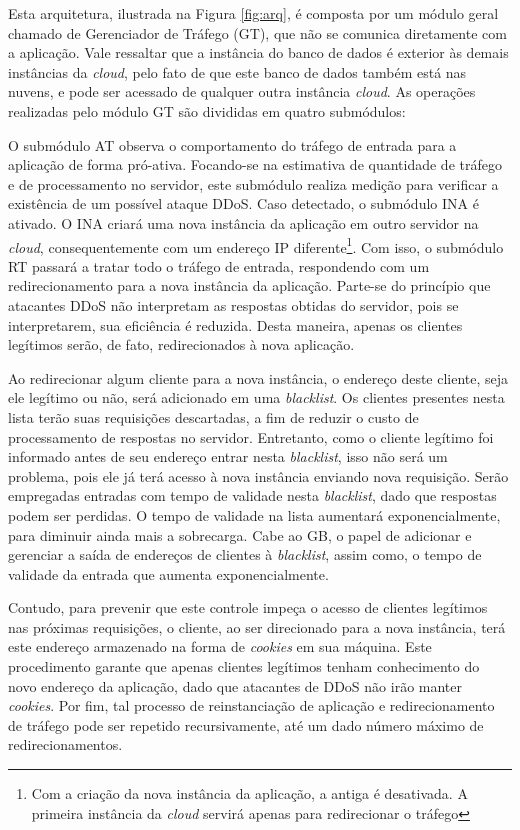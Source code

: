 Esta arquitetura, ilustrada na Figura \ref{fig:arq}, é composta por um módulo geral chamado de Gerenciador de Tráfego (GT), que não se comunica diretamente com a aplicação. Vale ressaltar que a instância do banco de dados é exterior às demais instâncias da \emph{cloud}, pelo fato de que este banco de dados também está nas nuvens, e pode ser acessado de qualquer outra instância \emph{cloud}. As operações realizadas pelo módulo GT são divididas em quatro submódulos:


O submódulo AT observa o comportamento do tráfego de entrada para a aplicação de forma pró-ativa. Focando-se na estimativa de quantidade de tráfego e de processamento no servidor, este submódulo realiza medição para verificar a existência de um possível ataque DDoS. Caso detectado, o submódulo INA é ativado. O INA criará uma nova instância da aplicação em outro servidor na \emph{cloud}, consequentemente com um endereço IP diferente\footnote{Com a criação da nova instância da aplicação, a antiga é desativada. A primeira instância da \emph{cloud} servirá apenas para redirecionar o tráfego}. Com isso, o submódulo RT passará a tratar todo o tráfego de entrada, respondendo com um redirecionamento para a nova instância da aplicação. Parte-se do princípio que atacantes DDoS não interpretam as respostas obtidas do servidor, pois se interpretarem, sua eficiência é reduzida. Desta maneira, apenas os clientes legítimos serão, de fato, redirecionados à nova aplicação.

Ao redirecionar algum cliente para a nova instância, o endereço deste cliente, seja ele legítimo ou não, será adicionado em uma \emph{blacklist}. Os clientes presentes nesta lista terão suas requisições descartadas, a fim de reduzir o custo de processamento de respostas no servidor. Entretanto, como o cliente legítimo foi informado antes de seu endereço entrar nesta \emph{blacklist}, isso não será um problema, pois ele já terá acesso à nova instância enviando nova requisição. Serão empregadas entradas com tempo de validade nesta \emph{blacklist}, dado que respostas podem ser perdidas. O tempo de validade na lista aumentará exponencialmente, para diminuir ainda mais a sobrecarga. Cabe ao GB, o papel de adicionar e gerenciar a saída de endereços de clientes à \emph{blacklist}, assim como, o tempo de validade da entrada que aumenta exponencialmente.

Contudo, para prevenir que este controle impeça o acesso de clientes legítimos nas próximas requisições, o cliente, ao ser direcionado para a nova instância, terá este endereço armazenado na forma de \emph{cookies} em sua máquina. Este procedimento garante que apenas clientes legítimos tenham conhecimento do novo endereço da aplicação, dado que atacantes de DDoS não irão manter \emph{cookies}. Por fim,  tal processo de reinstanciação de aplicação e redirecionamento de tráfego pode ser repetido recursivamente, até um dado número máximo de redirecionamentos.

